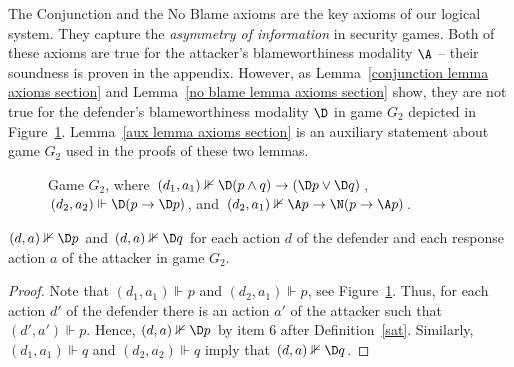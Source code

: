 \documentclass[letterpaper]{article}
\begin{document}
The Conjunction and the No Blame axioms are the key axioms of our logical system. They capture the {\em asymmetry of information} in security games. Both of these axioms are true for the attacker's blameworthiness modality $\A$ -- their soundness is proven in the appendix. However, as Lemma~\ref{conjunction lemma axioms section} and Lemma~\ref{no blame lemma axioms section} show, they are not true for the defender's blameworthiness modality $\D$ in game $G_2$ depicted in Figure~\ref{conjunction-axiom figure}. Lemma~\ref{aux lemma axioms section} is an auxiliary statement about game $G_2$ used in the proofs of these two lemmas.


\begin{figure}[ht]
\begin{center}
\vspace{0mm}
\vspace{0mm}
\caption{Game $G_2$, where $(d_1,a_1)\nVdash \D(p\wedge q)\to(\D p\vee\D q)$, $(d_2,a_2)\Vdash \D(p\to\D p)$, and $(d_2,a_1)\nVdash \A p \to \N(p\to \A p)$.}\label{conjunction-axiom figure}
\end{center}
\vspace{-3mm}
\end{figure}

\begin{lemma}\label{aux lemma axioms section}
$(d,a)\nVdash\D p$ and $(d,a)\nVdash\D q$ for each action $d$ of the defender and each response action $a$ of the attacker in game $G_2$.
\end{lemma}
\begin{proof}
Note that  $(d_1,a_1)\Vdash p$ and $(d_2,a_1)\Vdash p$, see Figure~\ref{conjunction-axiom figure}. Thus, for each action $d'$ of the defender there is an action $a'$ of the attacker such that $(d',a')\Vdash p$. Hence, $(d,a)\nVdash \D p$ by item 6 after Definition~\ref{sat}. Similarly, $(d_1,a_1)\Vdash q$ and $(d_2,a_2)\Vdash q$ imply that $(d,a)\nVdash \D q$.
\end{proof}
\end{document}
